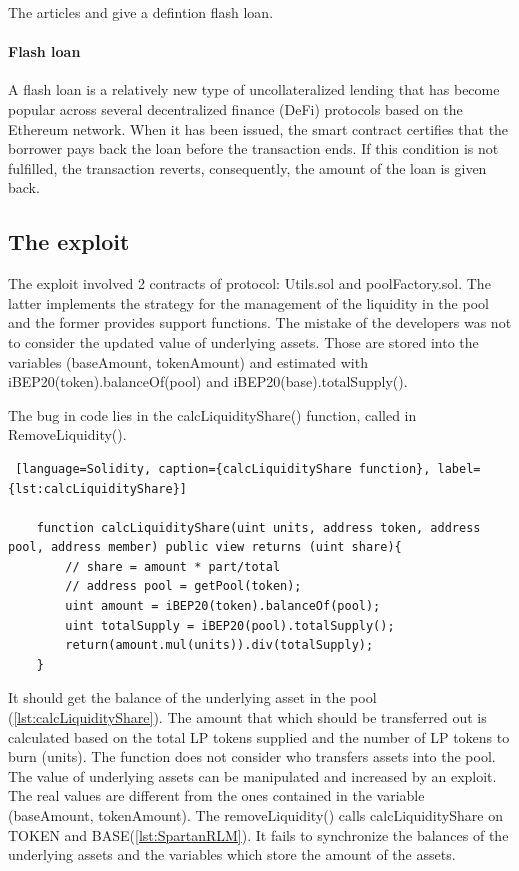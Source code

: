 The articles  and  give a defintion flash loan.

\paragraph{Flash loan} A flash loan is a relatively new type of uncollateralized lending that has become popular across
several decentralized finance (DeFi) protocols based on the Ethereum network. 
When it has been issued, the smart contract certifies that the borrower pays back the loan before the transaction ends. 
If this condition is not fulfilled, the transaction reverts, consequently, the amount of the loan is given back. 

\subsection{The exploit}
\label{sec:Spartan:Exploit}
The exploit involved 2 contracts of protocol: Utils.sol and poolFactory.sol.
The latter implements the strategy for the management of the liquidity in the pool and the former provides support functions. 
The mistake of the developers was not to consider the updated value of underlying assets. 
Those are stored into the variables (baseAmount, tokenAmount) and estimated with iBEP20(token).balanceOf(pool) and iBEP20(base).totalSupply().

The bug in code lies in the calcLiquidityShare() function, called in RemoveLiquidity(). 
\begin{lstlisting} [language=Solidity, caption={calcLiquidityShare function}, label={lst:calcLiquidityShare}]

    function calcLiquidityShare(uint units, address token, address pool, address member) public view returns (uint share){
        // share = amount * part/total
        // address pool = getPool(token);
        uint amount = iBEP20(token).balanceOf(pool);
        uint totalSupply = iBEP20(pool).totalSupply();
        return(amount.mul(units)).div(totalSupply);
    }

\end{lstlisting}

It should get the balance of the underlying asset in the pool (\autoref{lst:calcLiquidityShare}). 
The amount that which should be transferred out is calculated based on the total LP tokens supplied
and the number of LP tokens to burn (units).
The function does not consider who transfers assets into the pool. The value of underlying assets can be manipulated and increased by an exploit. 
The real values are different from the ones contained in the variable (baseAmount, tokenAmount).
The removeLiquidity() calls calcLiquidityShare on TOKEN and BASE(\autoref{lst:SpartanRLM}). 
It fails to synchronize the balances of the underlying assets and the variables which store the amount of the assets.

